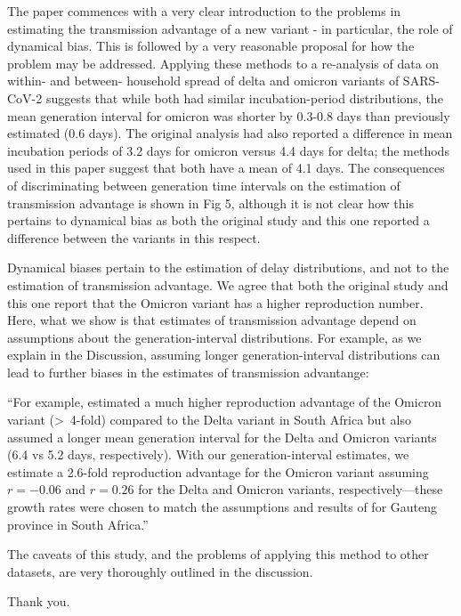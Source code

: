 \documentclass[12pt]{article}
\newcommand{\revtext}{\textsf}
\begin{document}
\revtext{The paper commences with a very clear introduction to the problems in estimating the transmission advantage of a new variant - in particular, the role of dynamical bias. This is followed by a very reasonable proposal for how the problem may be addressed. Applying these methods to a re-analysis of data on within- and between- household spread of delta and omicron variants of SARS-CoV-2 suggests that while both had similar incubation-period distributions, the mean generation interval for omicron was shorter by 0.3-0.8 days than previously estimated (0.6 days). The original analysis had also reported a difference in mean incubation periods of 3.2 days for omicron versus 4.4 days for delta; the methods used in this paper suggest that both have a mean of 4.1 days. The consequences of discriminating between generation time intervals on the estimation of transmission advantage is shown in Fig 5, although it is not clear how this pertains to dynamical bias as both the original study and this one reported a difference between the variants in this respect.}

Dynamical biases pertain to the estimation of delay distributions, and not to the estimation of transmission advantage. 
We agree that both the original study and this one report that the Omicron variant has a higher reproduction number. 
Here, what we show is that estimates of transmission advantage depend on assumptions about the generation-interval distributions. 
For example, as we explain in the Discussion, assuming longer generation-interval distributions can lead to further biases in the estimates of transmission advantange:

``For example, \cite{pearson2021bounding} estimated a much higher reproduction advantage of the Omicron variant (\textgreater\ 4-fold) compared to the Delta variant in South Africa but also assumed a longer mean generation interval for the Delta and Omicron variants (6.4 vs 5.2 days, respectively).
With our generation-interval estimates, we estimate a 2.6-fold reproduction advantage for the Omicron variant assuming $r=-0.06$ and $r=0.26$ for the Delta and Omicron variants, respectively---these growth rates were chosen to match the assumptions and results of \cite{pearson2021bounding} for Gauteng province in South Africa.''

\revtext{The caveats of this study, and the problems of applying this method to other datasets, are very thoroughly outlined in the discussion.} 

Thank you.
\end{document}
